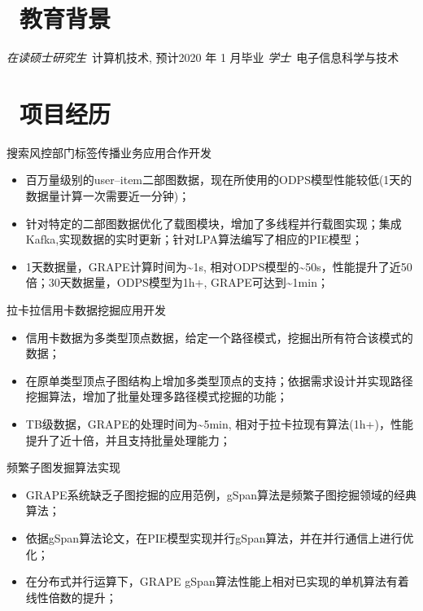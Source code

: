 \documentclass{resume}
\begin{document}
	
	
	
	\section{\faGraduationCap\  教育背景}
	\textit{在读硕士研究生}\ 计算机技术, 预计2020 年 1 月毕业
	\textit{学士}\ 电子信息科学与技术
	
	\section{\faUsers\ 项目经历}
	\begin{onehalfspacing}
	搜索风控部门标签传播业务应用合作开发
		\begin{itemize}
			\item 百万量级别的user--item二部图数据，现在所使用的ODPS模型性能较低(1天的数据量计算一次需要近一分钟)；
			\item 针对特定的二部图数据优化了载图模块，增加了多线程并行载图实现；集成Kafka,实现数据的实时更新；针对LPA算法编写了相应的PIE模型；
			\item 1天数据量，GRAPE计算时间为\~{}1s, 相对ODPS模型的\~{}50s，性能提升了近50倍；30天数据量，ODPS模型为1h+, GRAPE可达到\~{}1min；
		\end{itemize}
	\end{onehalfspacing}

	\begin{onehalfspacing}
	拉卡拉信用卡数据挖掘应用开发
		\begin{itemize}
			\item 信用卡数据为多类型顶点数据，给定一个路径模式，挖掘出所有符合该模式的数据；
			\item 在原单类型顶点子图结构上增加多类型顶点的支持；依据需求设计并实现路径挖掘算法，增加了批量处理多路径模式挖掘的功能；
			\item TB级数据，GRAPE的处理时间为\~{}5min, 相对于拉卡拉现有算法(1h+)，性能提升了近十倍，并且支持批量处理能力；
		\end{itemize}
	频繁子图发掘算法实现
		\begin{itemize}
			\item GRAPE系统缺乏子图挖掘的应用范例，gSpan算法是频繁子图挖掘领域的经典算法；
			\item 依据gSpan算法论文，在PIE模型实现并行gSpan算法，并在并行通信上进行优化；
			\item 在分布式并行运算下，GRAPE gSpan算法性能上相对已实现的单机算法有着线性倍数的提升；
		\end{itemize}
	\end{onehalfspacing}
	
\end{document}
